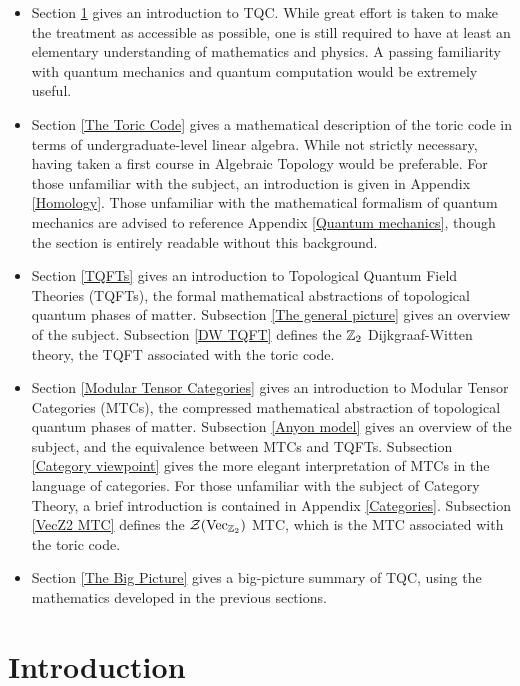 \documentclass{article}
\theoremstyle{definition}
\numberwithin{figure}{section}
\begin{document}
\begin{itemize}
\item Section \ref{Introduction} gives an introduction to TQC. While great effort is taken to make the treatment as accessible as possible, one is still required to have at least an elementary understanding of mathematics and physics. A passing familiarity with quantum mechanics and quantum computation would be extremely useful.

\item Section \ref{The Toric Code} gives a mathematical description of the toric code in terms of undergraduate-level linear algebra. While not strictly necessary, having taken a first course in Algebraic Topology would be preferable. For those unfamiliar with the subject, an introduction is given in Appendix \ref{Homology}. Those unfamiliar with the mathematical formalism of quantum mechanics are advised to reference Appendix \ref{Quantum mechanics}, though the section is entirely readable without this background.

\item Section \ref{TQFTs} gives an introduction to Topological Quantum Field Theories (TQFTs), the formal mathematical abstractions of topological quantum phases of matter. Subsection \ref{The general picture} gives an overview of the subject. Subsection \ref{DW TQFT} defines the $\mathbb{Z}_2$ Dijkgraaf-Witten theory, the TQFT associated with the toric code.

\item Section \ref{Modular Tensor Categories} gives an introduction to Modular Tensor Categories (MTCs), the compressed mathematical abstraction of topological quantum phases of matter. Subsection \ref{Anyon model} gives an overview of the subject, and the equivalence between MTCs and TQFTs. Subsection \ref{Category viewpoint} gives the more elegant interpretation of MTCs in the language of categories. For those unfamiliar with the subject of Category Theory, a brief introduction is contained in Appendix \ref{Categories}. Subsection \ref{VecZ2 MTC} defines the $\mathcal{Z}(\mathrm{Vec}_{\mathbb{Z}_2})$ MTC, which is the MTC associated with the toric code.

\item Section \ref{The Big Picture} gives a big-picture summary of TQC, using the mathematics developed in the previous sections.

\end{itemize}



\section{Introduction}
\label{Introduction}
\end{document}
